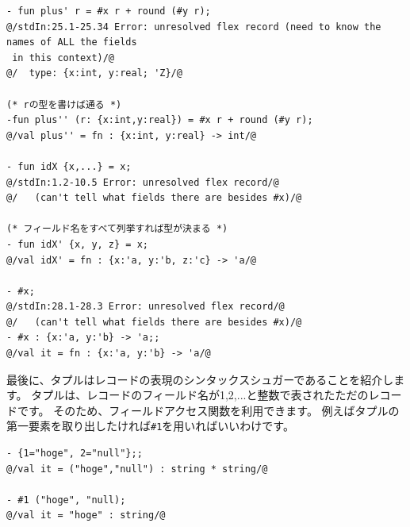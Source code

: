 \documentclass[11pt,a4paper]{article}
\begin{document}
\begin{lstlisting}[caption=フィールド名が解決出来ない例,label=code:unresolved-record]
- fun plus' r = #x r + round (#y r);
@/stdIn:25.1-25.34 Error: unresolved flex record (need to know the names of ALL the fields
 in this context)/@
@/  type: {x:int, y:real; 'Z}/@

(* rの型を書けば通る *)
-fun plus'' (r: {x:int,y:real}) = #x r + round (#y r);
@/val plus'' = fn : {x:int, y:real} -> int/@

- fun idX {x,...} = x;
@/stdIn:1.2-10.5 Error: unresolved flex record/@
@/   (can't tell what fields there are besides #x)/@

(* フィールド名をすべて列挙すれば型が決まる *)
- fun idX' {x, y, z} = x;
@/val idX' = fn : {x:'a, y:'b, z:'c} -> 'a/@

- #x;
@/stdIn:28.1-28.3 Error: unresolved flex record/@
@/   (can't tell what fields there are besides #x)/@
- #x : {x:'a, y:'b} -> 'a;;
@/val it = fn : {x:'a, y:'b} -> 'a/@
\end{lstlisting}

最後に、タプルはレコードの表現のシンタックスシュガーであることを紹介します。
タプルは、レコードのフィールド名が1,2,...と整数で表されたただのレコードです。
そのため、フィールドアクセス関数を利用できます。
例えばタプルの第一要素を取り出したければ\lstinline{#1}を用いればいいわけです。

\begin{lstlisting}[caption=タプルはレコード,label=code:tuple-is-record]
- {1="hoge", 2="null"};;
@/val it = ("hoge","null") : string * string/@

- #1 ("hoge", "null);
@/val it = "hoge" : string/@
\end{lstlisting}
\end{document}
